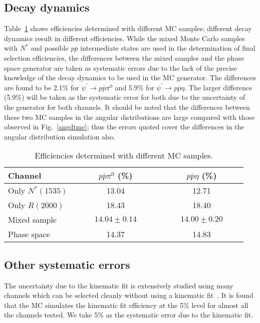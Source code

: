 \documentclass[prd,twocolumn,showpacs,amsmath,amssymb]{revtex4}
\newcommand{\piz}{\pi^0}
\newcommand{\ppb}{p\overline{p}}
\newcommand{\RR}{R(2000)}
\newcommand{\pspto}{\psi^\prime \rightarrow }
\begin{document}
\subsection{Decay dynamics}

Table~\ref{eff} shows efficiencies determined with different MC
samples; different decay dynamics result in different
efficiencies. While the mixed Monte Carlo samples with $N^*$ and
possible $\ppb$ intermediate states are used in the determination
of final selection efficiencies, the differences between the mixed
samples and the phase space generator are taken as systematic
errors due to the lack of the precise knowledge of the decay
dynamics to be used in the MC generator. The differences are found
to be 2.1\% for $\pspto \ppb \piz$ and 5.9\% for $\pspto \ppb
\eta$. The larger difference (5.9\%) will be taken as the
systematic error for both due to the uncertainty of the generator
for both channels. It should be noted that the differences between
these two MC samples in the angular distributions are large
compared with those observed in Fig.~\ref{angdtmc}; thus the
errors quoted cover the differences in the angular distribution
simulation also.

\begin{table}[htbp]
\caption{Efficiencies determined with different MC samples.}
\begin{center}
\begin{tabular}{lcc}\hline\hline
          Channel &   ~~~~~$\ppb \piz$ (\%)~~~~~
                         & ~~~~~$\ppb \eta$ (\%)~~~~~\\\hline
Only $N^*(1535)$  &   13.04            & 12.71 \\
Only $\RR$        &   18.43            & 18.40 \\
Mixed sample      &   $14.04\pm 0.14$  & $14.00\pm 0.20$ \\
Phase space       &   14.37            & 14.83 \\\hline\hline
\end{tabular}
\end{center}
\label{eff}
\end{table}

\subsection{Other systematic errors}

The uncertainty due to the kinematic fit is extensively studied
using many channels which can be selected cleanly without using a
kinematic fit~\cite{gpp,wangz,fangss,vt}. It is found that the MC
simulates the kinematic fit efficiency at the 5\% level for almost
all the channels tested. We take 5\% as the systematic error due
to the kinematic fit.
\end{document}
